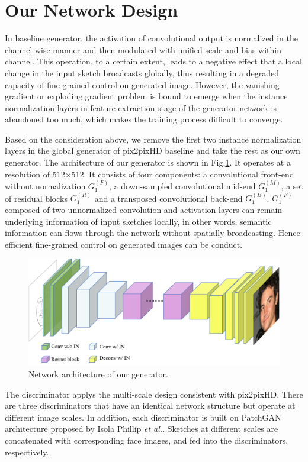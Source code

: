 \documentclass[10pt,twocolumn,letterpaper]{article}
\begin{document}
\section{Our Network Design}\label{sec:network}
%
In baseline generator, the activation of convolutional output is normalized in the channel-wise manner and then modulated with unified scale and bias within channel. 
This operation, to a certain extent, leads to a negative effect that a local change in the input sketch broadcasts globally, thus resulting in a degraded capacity of fine-grained control on generated image.
 However, the vanishing gradient or exploding gradient problem is bound to emerge when the instance normalization layers in feature extraction stage of the generator network is abandoned too much, which makes the training process difficult to converge. 
 
Based on the consideration above, we remove the first two instance normalization layers in the global generator of pix2pixHD baseline and take the rest as our own generator. 
The architecture of our generator is shown in Fig.\ref{fig:our_generator}. It operates at a resolution of 512×512. 
It consists of four components: a convolutional front-end without normalization $G_1^{(F)}$, a down-sampled convolutional mid-end $G_1^{(M)}$, a set of residual blocks $G_1^{(R)}$ and a transposed convolutional back-end $G_1^{(B)}$. 
$G_1^{(F)}$ composed of two unnormalized convolution and activation layers can remain underlying information of input sketches locally, in other words, semantic information can flows through the network without spatially broadcasting. 
Hence efficient fine-grained control on generated images can be conduct. 

\begin{figure}[htbp]
	\centering
	\includegraphics[width=0.8 \textwidth]{our_model_G.png}
	\caption{Network architecture of our generator. }
	\label{fig:our_generator}
\end{figure}

The discriminator applys the multi-scale design consistent with pix2pixHD. 
There are three discriminators that have an identical network structure but operate at different image scales. 
In addition, each discriminator is built on PatchGAN\cite{pix2pix} architecture proposed by Isola Phillip \textit{et al.}. Sketches at different scales are concatenated with corresponding face images, and fed into the discriminators, respectively. 
\end{document}
